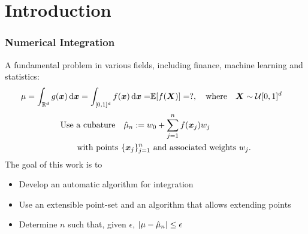 \documentclass[handout, 10pt,compress,xcolor={usenames,dvipsnames}]{beamer} %
\newcommand{\Ex}{\mathbb{E}}
\newcommand{\errtol}{{\epsilon}}
\newcommand{\pause}{}
\def\abs#1{\ensuremath{\left \lvert #1 \right \rvert}}
\begin{document}
\section{Introduction}
\frame
{
\frametitle{Numerical Integration}
\vspace{-5ex}
A fundamental problem in various fields, including finance, machine learning and statistics:
\vspace{-2ex}
\begin{align}
\label{eqn:defn_mu}
\mu = \int_{\reals^d} g(\vx) \,  \dif \vx = \int_{[0,1]^d} f(\vx) \,
\dif\vx  = & \Ex[f(\vX)] = ?, \quad \text{where} \quad \vX \sim \cu [0,1]^d
\end{align}
\vspace{-5ex}
\begin{align*}
 &\text{Use a cubature} \quad
\hmu_n := w_0 + \sum_{j=1}^{n} f(\vx_j) w_j \qquad
\\  \vspace{-2ex}
& \qquad \text{with points $\{\vx_j \}_{j=1}^{n}$ and associated weights $w_j$.}
\end{align*}
\vspace{-1ex}
\pause %
The goal of this work is to
\vspace{-2ex}
\begin{itemize}
\item Develop an automatic algorithm for integration
\item Use an \alert{extensible} point-set and an algorithm that allows extending points 
\item Determine \alert{$n$} such that, given \alert{$\errtol$}, $\abs{\mu-\hmu_n} \leq \errtol$
\end{itemize}
}
\end{document}
